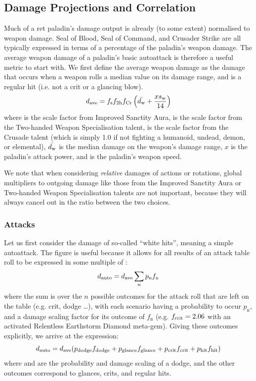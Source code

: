 \documentclass[letterpaper,11pt]{article}
\begin{document}
	\subsection{Damage Projections and Correlation}
	Much of a ret paladin's damage output is already (to some extent) normalised to weapon damage.	
	Seal of Blood, Seal of Command, and Crusader Strike are all typically expressed in terms of a percentage of the paladin's weapon damage.
	The average weapon damage of a paladin's basic autoattack is therefore a useful metric to start with.
	We first define the average weapon damage as the damage that occurs when a weapon rolls a median value on its damage range, and is a regular hit (i.e. not a crit or a glancing blow).
	\begin{equation}
		d_{\mathrm{ave}}  = f_{\mathrm{s}}  f_{\mathrm{2h}}  f_{\mathrm{Cr}}  \left( \bar{d_\mathrm{w} } + \frac{xs_\mathrm{w} }{14} \right)
	\end{equation}
	where \fimpsanc is the scale factor from Improved Sanctity Aura, \ftwoh is the scale factor from the Two-handed Weapon Specialisation talent, \fcrusade is the scale factor from the Crusade talent (which is simply 1.0 if not fighting a humanoid, undead, demon, or elemental), $\bar{d_\mathrm{w} }$ is the median damage on the weapon's damage range, $x$ is the paladin's attack power, and \ws is the paladin's weapon speed.

	We note that when considering \emph{relative} damages of actions or rotations, global multipliers to outgoing damage like those from the Improved Sanctity Aura or Two-handed Weapon Specialisation talents are not important, because they will always cancel out in the ratio between the two choices.

	\subsubsection{Attacks}
	Let us first consider the damage \dauto of so-called ``white hits'', meaning a simple autoattack.
	The \dave figure is useful because it allows for all results of an attack table roll to be expressed in some multiple of \dave:
	\begin{equation}
		d_{\mathrm{auto}}  = d_{\mathrm{ave}}  \sum_n p_{\mathrm{n}} f_{\mathrm{n}}
	\end{equation}
	where the sum is over the $n$ possible outcomes for the attack roll that are left on the table (e.g. crit, dodge \ldots), with each scenario having a probability to occur $p_{\mathrm{n}}$, and a damage scaling factor for its outcome of $f_{\mathrm{n}}$ (e.g. $f_{\mathrm{crit}}  = 2.06$ with an activated Relentless Earthstorm Diamond meta-gem).
	Giving these outcomes explicitly, we arrive at the expression:
	\begin{equation}
		d_{\mathrm{auto}}  = d_{\mathrm{ave}}  (p_{\mathrm{dodge}}  f_{\mathrm{dodge}}  + p_{\mathrm{glance}}  f_{\mathrm{glance}}  + p_{\mathrm{crit}}  f_{\mathrm{crit}}  + p_{\mathrm{hit}}  f_{\mathrm{hit}} )
	\end{equation}
	where \pdodge and \fdodge are the probability and damage scaling of a dodge, and the other outcomes correspond to glances, crits, and regular hits. 
	
\end{document}
